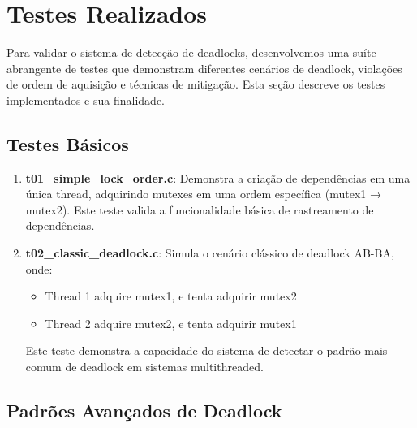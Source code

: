 \section{Testes Realizados}

Para validar o sistema de detecção de deadlocks, desenvolvemos uma suíte abrangente de testes que demonstram diferentes cenários de deadlock, violações de ordem de aquisição e técnicas de mitigação. Esta seção descreve os testes implementados e sua finalidade.

\subsection{Testes Básicos}

\begin{enumerate}
    \item \textbf{t01\_simple\_lock\_order.c}: Demonstra a criação de dependências em uma única thread, adquirindo mutexes em uma ordem específica (mutex1 → mutex2). Este teste valida a funcionalidade básica de rastreamento de dependências.

    \item \textbf{t02\_classic\_deadlock.c}: Simula o cenário clássico de deadlock AB-BA, onde:
    \begin{itemize}
        \item Thread 1 adquire mutex1, e tenta adquirir mutex2
        \item Thread 2 adquire mutex2, e tenta adquirir mutex1
    \end{itemize}
    Este teste demonstra a capacidade do sistema de detectar o padrão mais comum de deadlock em sistemas multithreaded.
\end{enumerate}

\subsection{Padrões Avançados de Deadlock}

